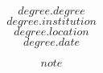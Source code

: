 


\begin{cventries}
 \cventry
    {$$degree.degree$$} %
    {$$degree.institution$$}%
    {$$degree.location$$} %
    {$$degree.date$$} %
	{
      \begin{cvitems} %
        \item{$$note$$} 
      \end{cvitems}
    }
\end{cventries}



